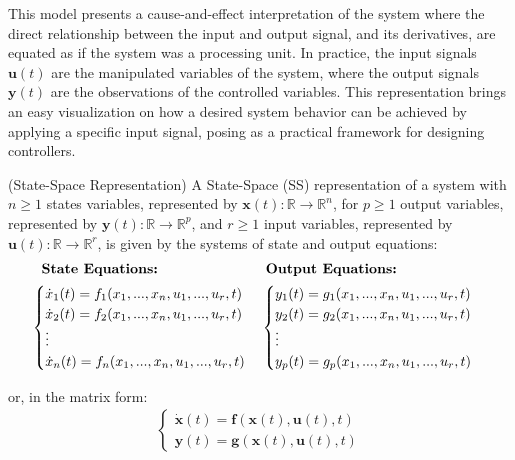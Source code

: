 \documentclass[a4paper,11pt]{book}
\numberwithin{figure}{chapter}
\numberwithin{equation}{chapter}
\numberwithin{table}{chapter}
\theoremstyle{definition}
\newtheorem{definition}{Definition}[chapter]
\newcounter{boxed-theorem}
\newcounter{boxed-definition}
\newenvironment{boxed-definition}[1]
{\begin{shaded} \begin{definition}{#1}}
{\end{definition} \end{shaded}}
\begin{document}
This model presents a cause-and-effect interpretation of the system where the direct relationship between the input and output signal, and its derivatives, are equated as if the system was a processing unit. In practice, the input signals $\bm{u}(t)$ are the manipulated variables of the system, where the output signals $\bm{y}(t)$ are the observations of the controlled variables. This representation brings an easy visualization on how a desired system behavior can be achieved by applying a specific input signal, posing as a practical framework for designing controllers. 

\begin{boxed-definition}{(State-Space Representation)} \label{th:SSRepr01}
	A State-Space (SS) representation of a system with $n \geq 1$ states variables, represented by $\bm{x}(t) : \mathbb{R} \rightarrow \mathbb{R}^{n}$, for $p \geq 1$ output variables, represented by $\bm{y}(t) : \mathbb{R} \rightarrow \mathbb{R}^{p}$, and $r \geq 1$ input variables, represented by $\bm{u}(t) : \mathbb{R} \rightarrow \mathbb{R}^{r}$, is given by the systems of state and output equations:
	\begin{align} \label{eq:SSRepr01}
	\begin{split}
	\textbf{State Equations:}\ \ \ \ \ \ \ \ \ \ \ \ \ \ \ \ \ \ \ \ \ \  \hfill & \textbf{ Output Equations:} \hfill \\
	\begin{cases}
		\dot{x}_1(t) = f_1(x_1, ..., x_n, u_1, ..., u_r, t) \\
		\dot{x}_2(t) = f_2(x_1, ..., x_n, u_1, ..., u_r, t) \\
		\vdots \\
		\dot{x}_n(t) = f_n(x_1, ..., x_n, u_1, ..., u_r, t)
	\end{cases} \hfill & \begin{cases}
		y_1(t) = g_1(x_1, ..., x_n, u_1, ..., u_r, t) \\
		y_2(t) = g_2(x_1, ..., x_n, u_1, ..., u_r, t) \\
		\vdots \\
		y_p(t) = g_p(x_1, ..., x_n, u_1, ..., u_r, t) \hfill
	\end{cases}
	\end{split}
	\end{align}
	
	\noindent or, in the matrix form:
	\begin{align} \label{eq:SSRepr02}
	\begin{cases}
		\dot{\bm{x}}(t) = \bm{f}(\bm{x}(t), \bm{u}(t), t) \\
		\bm{y}(t) = \bm{g}(\bm{x}(t), \bm{u}(t), t)
	\end{cases}
	\end{align}
\end{boxed-definition}
\end{document}

